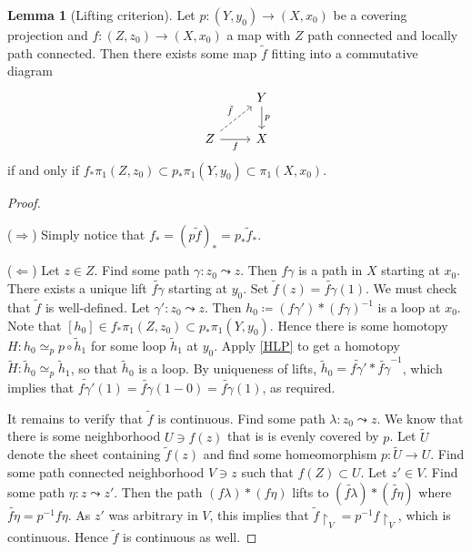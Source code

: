 \documentclass[10pt,letterpaper,cm]{nupset}
\theoremstyle{definition}
\theoremstyle{theorem}
\newtheorem{lemma}[definition]{Lemma}
\theoremstyle{remark}
\newcommand{\1}{\mathbb{1}}
\newcommand{\0}{\vec 0}
\begin{document}
\begin{lemma}[Lifting criterion]\label{LC}
Let $p: \left(Y, y_0\right) \to \left(X, x_0\right)$ be a covering projection and $f: (Z, z_0) \to \left(X, x_0\right)$ a map with $Z$ path connected and locally path connected.  Then there exists some map $\tilde{f}$ fitting into a commutative diagram \[
\begin{tikzcd}
 & Y \arrow[d, "p"] \\
Z \arrow[r, "f"'] \arrow[ru, "\tilde{f}", dashed] & X
\end{tikzcd}
\] if and only if  $f_{\ast}\pi_1(Z, z_0) \subset p_{\ast} \pi_1\left(Y, y_0\right) \subset \pi_1\left(X, x_0\right)$. 
\end{lemma}
\begin{proof} $ $

\smallskip

($\Longrightarrow$) Simply notice that $f_{\ast} = \left(p\tilde{f}\right)_{\ast}= p_{\ast}\tilde{f}_{\ast}$.

\medskip

 
($\Longleftarrow$) Let $z\in Z$. Find some path $\gamma : z_0 \leadsto z$.  Then $f \gamma$ is a path in $X$ starting at $x_0$. There exists a unique lift $\widetilde{f \gamma}$ starting at $y_0$. Set $\tilde{f}(z) = \widetilde{f \gamma}(1)$. We must check that $\tilde{f}$ is well-defined. Let $\gamma' : z_0 \leadsto z$. Then $h_0\coloneqq (f \gamma ')\ast (f\gamma)^{-1}$ is a loop at $x_0$. Note that $[h_0] \in f_{\ast}\pi_1(Z, z_0) \subset p_{\ast} \pi_1\left(Y, y_0\right)$. Hence there is some homotopy $H: h_0 \simeq_p p \circ \tilde{h}_1$ for some loop $\tilde{h}_1$ at $y_0$. Apply \cref{HLP} to get a homotopy $\widetilde{H} : \tilde{h}_0 \simeq_p \tilde{h}_1$, so that $\tilde{h}_0$ is a loop. By uniqueness of lifts, $\tilde{h}_0 =\widetilde{f \gamma '}\ast \widetilde{f\gamma}^{-1}$, which implies that $\widetilde{f \gamma '}(1) = \widetilde{f\gamma}(1-0) = \widetilde{f\gamma}(1)$, as required.

\medskip

 It remains to verify that $\tilde{f}$ is continuous. Find some path $\lambda : z_0 \leadsto z$. We know that there is some neighborhood $U \ni f(z)$ that is is evenly covered by $p$. Let $\widetilde{U}$ denote the sheet containing $\tilde{f}(z)$ and find some homeomorphism $p : \widetilde{U} \to U $. Find some path connected neighborhood $V\ni z$ such that $f(Z) \subset U$. Let $z' \in V$. Find some path $\eta : z \leadsto z'$. Then the path $(f \lambda )\ast (f \eta)$ lifts to $\left(\widetilde{f \lambda}\right) \ast \left(\widetilde{f \eta}\right)$ where $\widetilde{f\eta} = p^{-1}f\eta$. As $z'$ was arbitrary in $V$, this implies that $\tilde{f}\restriction_V =p^{-1}f\restriction_V$, which is continuous. Hence $\tilde{f}$ is continuous as well. 
\end{proof}
\end{document}
